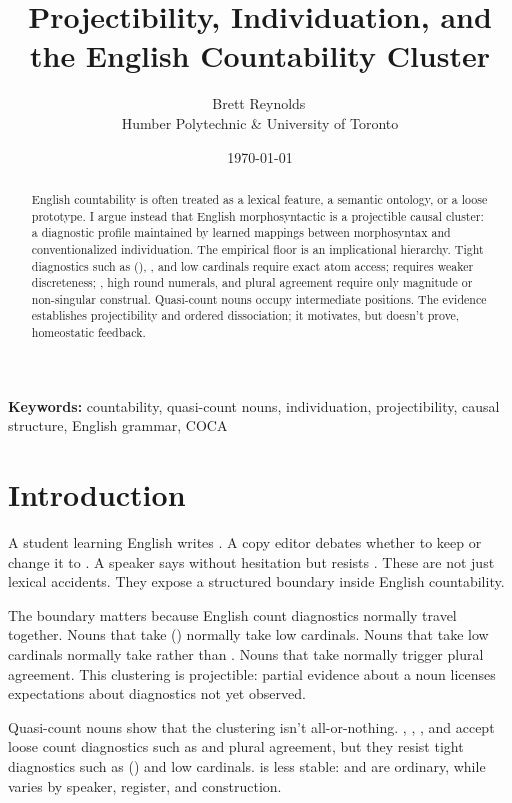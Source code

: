 \documentclass[12pt,a4paper]{article}
\title{Projectibility, Individuation, and the English Countability Cluster}
\author{Brett Reynolds\,\orcidlink{0000-0003-0073-7195}\\Humber Polytechnic \& University of Toronto}
\date{\today}
\begin{document}
\maketitle

\noindent\textbf{Keywords:} countability, quasi-count nouns, individuation, projectibility, causal structure, English grammar, COCA

\begin{abstract}
English countability is often treated as a lexical feature, a semantic ontology, or a loose prototype. I argue instead that English morphosyntactic  is a projectible causal cluster: a diagnostic profile maintained by learned mappings between morphosyntax and conventionalized individuation. The empirical floor is an implicational hierarchy. Tight diagnostics such as (), , and low cardinals require exact atom access;  requires weaker discreteness; , high round numerals, and plural agreement require only magnitude or non-singular construal. Quasi-count nouns occupy intermediate positions. The evidence establishes projectibility and ordered dissociation; it motivates, but doesn't prove, homeostatic feedback.
\end{abstract}

\section{Introduction}

A student learning English writes . A copy editor debates whether to keep  or change it to . A speaker says  without hesitation but resists . These are not just lexical accidents. They expose a structured boundary inside English countability.

The boundary matters because English count diagnostics normally travel together. Nouns that take () normally take low cardinals. Nouns that take low cardinals normally take  rather than . Nouns that take  normally trigger plural agreement. This clustering is projectible: partial evidence about a noun licenses expectations about diagnostics not yet observed.

Quasi-count nouns show that the clustering isn't all-or-nothing. , , , and  accept loose count diagnostics such as  and plural agreement, but they resist tight diagnostics such as () and low cardinals.  is less stable:  and  are ordinary, while  varies by speaker, register, and construction.
\end{document}
